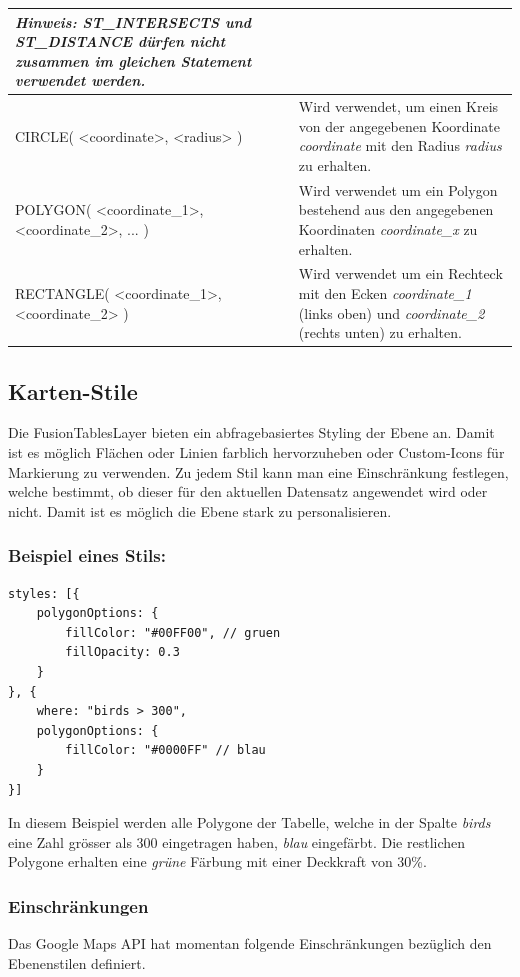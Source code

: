 \begin{tabular}{|p{4cm}|p{11cm}|}
\textit{Hinweis: ST{\_}INTERSECTS und ST{\_}DISTANCE dürfen nicht zusammen im gleichen Statement verwendet werden.} \\ 
\hline 
CIRCLE( {\textless}coordinate{\textgreater}, {\textless}radius{\textgreater} ) & Wird verwendet, um einen Kreis von der angegebenen Koordinate \emph{coordinate} mit den Radius \emph{radius} zu erhalten. \\ 
\hline 
POLYGON( {\textless}coordinate{\_}1{\textgreater}, {\textless}coordinate{\_}2{\textgreater}, ... ) & Wird verwendet um ein Polygon bestehend aus den angegebenen Koordinaten \emph{coordinate{\_}x} zu erhalten. \\ 
\hline 
RECTANGLE( {\textless}coordinate{\_}1{\textgreater}, {\textless}coordinate{\_}2{\textgreater} ) & Wird verwendet um ein Rechteck mit den Ecken \emph{coordinate{\_}1} (links oben) und \emph{coordinate{\_}2} (rechts unten) zu erhalten. \\ 
\hline 
\end{tabular} 

\subsection{Karten-Stile}
Die FusionTablesLayer bieten ein abfragebasiertes Styling der Ebene an. Damit ist es möglich Flächen oder Linien farblich hervorzuheben oder Custom-Icons für Markierung zu verwenden. Zu jedem Stil kann man eine Einschränkung festlegen, welche bestimmt, ob dieser für den aktuellen Datensatz angewendet wird oder nicht. Damit ist es möglich die Ebene stark zu personalisieren.

\subsubsection{Beispiel eines Stils:}
\lstset{language=JavaScript}
\begin{lstlisting}
styles: [{
	polygonOptions: {
		fillColor: "#00FF00", // gruen
		fillOpacity: 0.3
	}
}, {
	where: "birds > 300",
	polygonOptions: {
		fillColor: "#0000FF" // blau
	}
}]
\end{lstlisting}

In diesem Beispiel werden alle Polygone der Tabelle, welche in der Spalte \emph{birds} eine Zahl grösser als 300 eingetragen haben, \emph{blau} eingefärbt. Die restlichen Polygone erhalten eine \emph{grüne} Färbung mit einer Deckkraft von 30\%.

\subsubsection{Einschränkungen}
Das Google Maps API hat momentan folgende Einschränkungen bezüglich den Ebenenstilen definiert.

